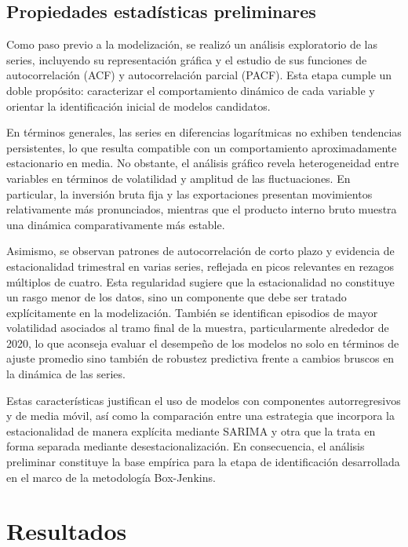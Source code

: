 \documentclass[11pt]{article}
\begin{document}
\subsection{Propiedades estadísticas preliminares}

Como paso previo a la modelización, se realizó un análisis exploratorio de las series, incluyendo su representación gráfica y el estudio de sus funciones de autocorrelación (ACF) y autocorrelación parcial (PACF). Esta etapa cumple un doble propósito: caracterizar el comportamiento dinámico de cada variable y orientar la identificación inicial de modelos candidatos.

En términos generales, las series en diferencias logarítmicas no exhiben tendencias persistentes, lo que resulta compatible con un comportamiento aproximadamente estacionario en media. No obstante, el análisis gráfico revela heterogeneidad entre variables en términos de volatilidad y amplitud de las fluctuaciones. En particular, la inversión bruta fija y las exportaciones presentan movimientos relativamente más pronunciados, mientras que el producto interno bruto muestra una dinámica comparativamente más estable.

Asimismo, se observan patrones de autocorrelación de corto plazo y evidencia de estacionalidad trimestral en varias series, reflejada en picos relevantes en rezagos múltiplos de cuatro. Esta regularidad sugiere que la estacionalidad no constituye un rasgo menor de los datos, sino un componente que debe ser tratado explícitamente en la modelización. También se identifican episodios de mayor volatilidad asociados al tramo final de la muestra, particularmente alrededor de 2020, lo que aconseja evaluar el desempeño de los modelos no solo en términos de ajuste promedio sino también de robustez predictiva frente a cambios bruscos en la dinámica de las series.

Estas características justifican el uso de modelos con componentes autorregresivos y de media móvil, así como la comparación entre una estrategia que incorpora la estacionalidad de manera explícita mediante SARIMA y otra que la trata en forma separada mediante desestacionalización. En consecuencia, el análisis preliminar constituye la base empírica para la etapa de identificación desarrollada en el marco de la metodología Box-Jenkins.

\section{Resultados}
\end{document}
